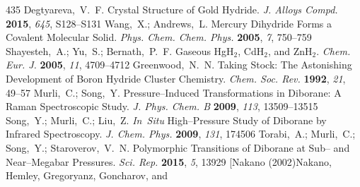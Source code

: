 \documentclass[12pt,letterpaper,oneside]{article}
\begin{document}
\begin{mcitethebibliography}{435}
\EndOfBibitem
{}
Degtyareva,~V.~F. Crystal Structure of Gold Hydride. \emph{J. Alloys Compd.}
  \textbf{2015}, \emph{645}, S128--S131\relax
\mciteBstWouldAddEndPuncttrue
\mciteSetBstMidEndSepPunct{\mcitedefaultmidpunct}
{\mcitedefaultendpunct}{\mcitedefaultseppunct}\relax
\EndOfBibitem
{}
Wang,~X.; Andrews,~L. Mercury Dihydride Forms a Covalent Molecular Solid.
  \emph{Phys. Chem. Chem. Phys.} \textbf{2005}, \emph{7}, 750--759\relax
\mciteBstWouldAddEndPuncttrue
\mciteSetBstMidEndSepPunct{\mcitedefaultmidpunct}
{\mcitedefaultendpunct}{\mcitedefaultseppunct}\relax
\EndOfBibitem
{}
Shayesteh,~A.; Yu,~S.; Bernath,~P.~F. Gaseous HgH$_2$, CdH$_2$, and ZnH$_2$.
  \emph{Chem. Eur. J.} \textbf{2005}, \emph{11}, 4709--4712\relax
\mciteBstWouldAddEndPuncttrue
\mciteSetBstMidEndSepPunct{\mcitedefaultmidpunct}
{\mcitedefaultendpunct}{\mcitedefaultseppunct}\relax
\EndOfBibitem
{}
Greenwood,~N.~N. Taking Stock: The Astonishing Development of Boron Hydride
  Cluster Chemistry. \emph{Chem. Soc. Rev.} \textbf{1992}, \emph{21},
  49--57\relax
\mciteBstWouldAddEndPuncttrue
\mciteSetBstMidEndSepPunct{\mcitedefaultmidpunct}
{\mcitedefaultendpunct}{\mcitedefaultseppunct}\relax
\EndOfBibitem
{}
Murli,~C.; Song,~Y. Pressure--Induced Transformations in Diborane: A Raman
  Spectroscopic Study. \emph{J. Phys. Chem. B} \textbf{2009}, \emph{113},
  13509--13515\relax
\mciteBstWouldAddEndPuncttrue
\mciteSetBstMidEndSepPunct{\mcitedefaultmidpunct}
{\mcitedefaultendpunct}{\mcitedefaultseppunct}\relax
\EndOfBibitem
{}
Song,~Y.; Murli,~C.; Liu,~Z. \emph{In~Situ} High--Pressure Study of Diborane by
  Infrared Spectroscopy. \emph{J. Chem. Phys.} \textbf{2009}, \emph{131},
  174506\relax
\mciteBstWouldAddEndPuncttrue
\mciteSetBstMidEndSepPunct{\mcitedefaultmidpunct}
{\mcitedefaultendpunct}{\mcitedefaultseppunct}\relax
\EndOfBibitem
{}
Torabi,~A.; Murli,~C.; Song,~Y.; Staroverov,~V.~N. Polymorphic Transitions of
  Diborane at Sub-- and Near--Megabar Pressures. \emph{Sci. Rep.}
  \textbf{2015}, \emph{5}, 13929\relax
\mciteBstWouldAddEndPuncttrue
\mciteSetBstMidEndSepPunct{\mcitedefaultmidpunct}
{\mcitedefaultendpunct}{\mcitedefaultseppunct}\relax
\EndOfBibitem
\bibitem[Nakano (2002)Nakano, Hemley, Gregoryanz, Goncharov, and

\end{mcitethebibliography}
\end{document}
